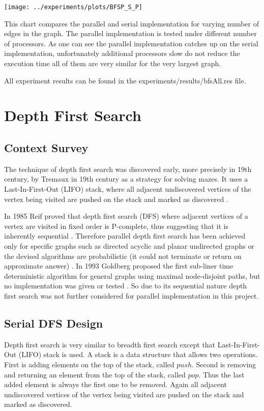 \documentclass{report}
\theoremstyle{plain}
\theoremstyle{definition}
\theoremstyle{remark}
\begin{document}
\texttt{[image: ../experiments/plots/BFSP\_S\_P]}

This chart compares the parallel and serial implementation for varying number of edges in the graph. The parallel implementation is tested under different number of processors. As one can see the parallel implementation catches up on the serial implementation, unfortunately additional processors slow do not reduce the execution time all of them are very similar for the very largest graph.

All experiment results can be found in the experiments/results/bfsAll.res file.

\chapter{Depth First Search}

\section{Context Survey}

The technique of depth first search was discovered  early, more precisely in 19th century, by Tremaux in 19th century as a strategy for solving mazes. It uses a Last-In-First-Out (LIFO) stack, where all adjacent undiscovered vertices of the vertex being visited are pushed on the stack and marked as discovered \cite{c++_sedgewick}.

In 1985 Reif proved that depth first search (DFS) where adjacent vertices of a vertex are visited in fixed order is P-complete, thus suggesting that it is inherently sequential \cite{reif1985depth}. Therefore parallel depth first search has been achieved only for specific graphs such as directed acyclic \cite{ghosh1984parallel} and planar undirected graphs \cite{hagerup1990planar} or the devised algorithms are probabilistic (it could not terminate or return on approximate answer) \cite{aggarwal1989parallel}. In 1993 Goldberg proposed the first sub-liner time deterministic algorithm for general graphs using maximal node-disjoint paths, but no implementation was given or tested \cite{goldberg1993sublinear}. So due to its sequential nature depth first search was not further considered for parallel implementation in this project.

\section{Serial DFS Design}

Depth first search is very similar to breadth first search except that Last-In-First-Out (LIFO) stack is used. A stack is a data structure that allows two operations. First is adding elements on the top of the stack, called $push$. Second is removing and returning an element from the top of the stack, called $pop$. Thus the last added element is always the first one to be removed. Again all adjacent undiscovered vertices of the vertex being visited are pushed on the stack and marked as discovered.
\end{document}
